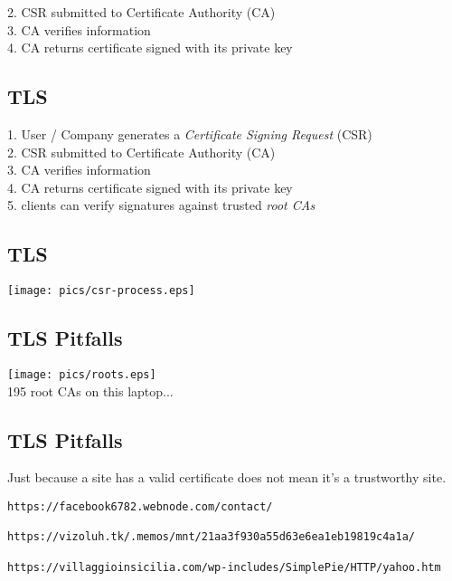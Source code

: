 \documentclass[xga]{xdvislides}
\begin{document}
2. CSR submitted to Certificate Authority (CA) \\

3. CA verifies information \\

4. CA returns certificate signed with its private key \\

\subsection{TLS}
1. User / Company generates a {\em Certificate Signing Request} (CSR) \\

2. CSR submitted to Certificate Authority (CA) \\

3. CA verifies information \\

4. CA returns certificate signed with its private key \\

5. clients can verify signatures against trusted {\em root CAs} \\

\subsection{TLS}
\begin{center}
	\texttt{[image: pics/csr-process.eps]}
\end{center}



\subsection{TLS Pitfalls}
\begin{center}
	\texttt{[image: pics/roots.eps]} \\
	195 root CAs on this laptop...
\end{center}

\subsection{TLS Pitfalls}
Just because a site has a valid certificate does not
mean it's a trustworthy site. \\

\begin{verbatim}
https://facebook6782.webnode.com/contact/

https://vizoluh.tk/.memos/mnt/21aa3f930a55d63e6ea1eb19819c4a1a/

https://villaggioinsicilia.com/wp-includes/SimplePie/HTTP/yahoo.htm

\end{verbatim}
\end{document}
